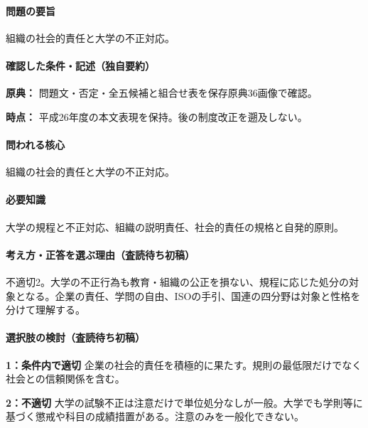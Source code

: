 \paragraph{問題の要旨} 組織の社会的責任と大学の不正対応。

\paragraph{確認した条件・記述（独自要約）}\mbox{}\par

\noindent\textbf{原典：} 問題文・否定・全五候補と組合せ表を保存原典36画像で確認。\par

\noindent\textbf{時点：} 平成26年度の本文表現を保持。後の制度改正を遡及しない。\par

\paragraph{問われる核心} 組織の社会的責任と大学の不正対応。

\paragraph{必要知識} 大学の規程と不正対応、組織の説明責任、社会的責任の規格と自発的原則。

\paragraph{考え方・正答を選ぶ理由（査読待ち初稿）} 不適切2。大学の不正行為も教育・組織の公正を損ない、規程に応じた処分の対象となる。企業の責任、学問の自由、ISOの手引、国連の四分野は対象と性格を分けて理解する。

\paragraph{選択肢の検討（査読待ち初稿）}\mbox{}\par

\noindent\textbf{1：条件内で適切} 企業の社会的責任を積極的に果たす。規則の最低限だけでなく社会との信頼関係を含む。\par

\noindent\textbf{2：不適切} 大学の試験不正は注意だけで単位処分なしが一般。大学でも学則等に基づく懲戒や科目の成績措置がある。注意のみを一般化できない。\par

